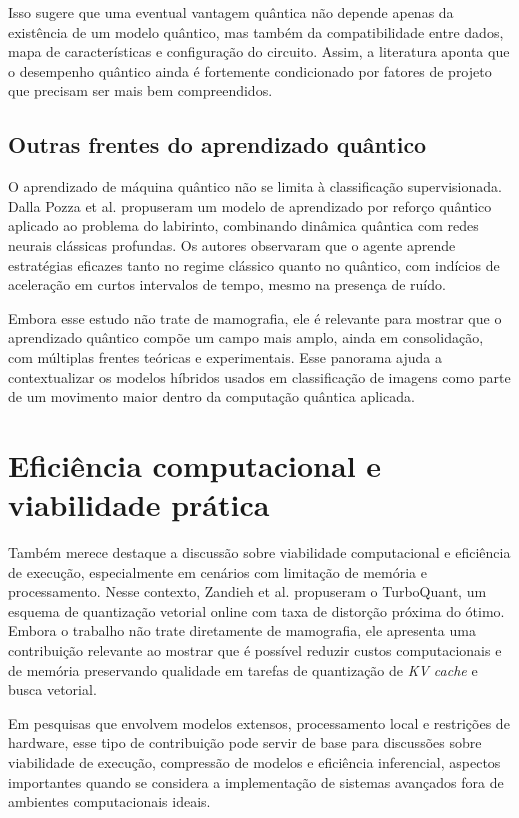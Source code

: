 \documentclass[
    12pt,
    openright,
    oneside,
    a4paper,
    english,
    brazil
]{abntex2}
\begin{document}
Isso sugere que uma eventual vantagem quântica não depende apenas da existência de um modelo quântico, mas também da compatibilidade entre dados, mapa de características e configuração do circuito. Assim, a literatura aponta que o desempenho quântico ainda é fortemente condicionado por fatores de projeto que precisam ser mais bem compreendidos.

\subsection{Outras frentes do aprendizado quântico}

O aprendizado de máquina quântico não se limita à classificação supervisionada. Dalla Pozza et al. \cite{dallapozza2022} propuseram um modelo de aprendizado por reforço quântico aplicado ao problema do labirinto, combinando dinâmica quântica com redes neurais clássicas profundas. Os autores observaram que o agente aprende estratégias eficazes tanto no regime clássico quanto no quântico, com indícios de aceleração em curtos intervalos de tempo, mesmo na presença de ruído.

Embora esse estudo não trate de mamografia, ele é relevante para mostrar que o aprendizado quântico compõe um campo mais amplo, ainda em consolidação, com múltiplas frentes teóricas e experimentais. Esse panorama ajuda a contextualizar os modelos híbridos usados em classificação de imagens como parte de um movimento maior dentro da computação quântica aplicada.

\section{Eficiência computacional e viabilidade prática}

Também merece destaque a discussão sobre viabilidade computacional e eficiência de execução, especialmente em cenários com limitação de memória e processamento. Nesse contexto, Zandieh et al. \cite{zandieh2025} propuseram o TurboQuant, um esquema de quantização vetorial online com taxa de distorção próxima do ótimo. Embora o trabalho não trate diretamente de mamografia, ele apresenta uma contribuição relevante ao mostrar que é possível reduzir custos computacionais e de memória preservando qualidade em tarefas de quantização de \textit{KV cache} e busca vetorial.

Em pesquisas que envolvem modelos extensos, processamento local e restrições de hardware, esse tipo de contribuição pode servir de base para discussões sobre viabilidade de execução, compressão de modelos e eficiência inferencial, aspectos importantes quando se considera a implementação de sistemas avançados fora de ambientes computacionais ideais.
\end{document}
